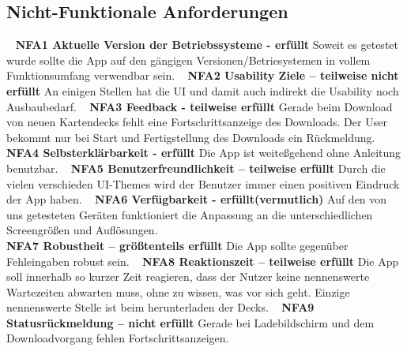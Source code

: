 \documentclass{scrartcl}
\begin{document}
\subsection{Nicht-Funktionale Anforderungen}
\ \newline
\textbf{NFA1 Aktuelle Version der Betriebssysteme - erfüllt} \newline
Soweit es getestet wurde sollte die App auf den gängigen Versionen/Betriesystemen in vollem Funktionsumfang verwendbar sein.
\ \newline
\textbf{NFA2 Usability Ziele – teilweise nicht erfüllt} \newline
An einigen Stellen hat die UI und damit auch indirekt die Usability noch Ausbaubedarf.
\ \newline
\textbf{NFA3 Feedback - teilweise erfüllt} \newline
Gerade beim Download von neuen Kartendecks fehlt eine Fortschrittsanzeige des Downloads. Der User bekommt nur bei Start und Fertigstellung des Downloads ein Rückmeldung. 
\pagebreak
\textbf{NFA4 Selbsterklärbarkeit - erfüllt} \newline
Die App ist weiteßgehend ohne Anleitung benutzbar.
\ \newline
\textbf{NFA5 Benutzerfreundlichkeit – teilweise erfüllt} \newline
Durch die vielen verschieden UI-Themes wird der Benutzer immer einen positiven Eindruck der App haben.
\ \newline
\textbf{NFA6 Verfügbarkeit - erfüllt(vermutlich)} \newline
Auf den von uns getesteten Geräten funktioniert die Anpassung an die unterschiedlichen Screengrößen und Auflösungen.
\ \newline
\\
\textbf{NFA7 Robustheit – größtenteils erfüllt} \newline
Die App sollte gegenüber Fehleingaben robust sein.
\ \newline
\textbf{NFA8 Reaktionszeit – teilweise erfüllt} \newline
Die App soll innerhalb so kurzer Zeit reagieren, dass der Nutzer keine nennenswerte Wartezeiten abwarten muss, ohne zu wissen, was vor sich geht.
Einzige nennenswerte Stelle ist beim herunterladen der Decks.
\ \newline
\textbf{NFA9 Statusrückmeldung – nicht erfüllt} \newline
Gerade bei Ladebildschirm und dem Downloadvorgang fehlen Fortschrittsanzeigen.
\ \newline
\end{document}
